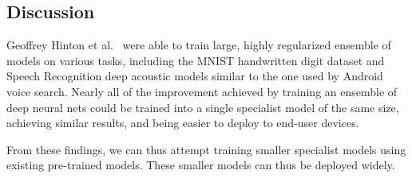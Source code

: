 \subsection{Discussion}

Geoffrey Hinton et al.~\cite{hinton2015distilling} were able to train large, highly regularized
ensemble of models on various tasks, including the MNIST handwritten digit dataset and Speech 
Recognition deep acoustic models similar to the one used by Android voice search. Nearly all of the 
improvement achieved by training an ensemble of deep neural nets could be trained into a single specialist
model of the same size, achieving similar results, and being easier to deploy to end-user devices.

From these findings, we can thus attempt training smaller specialist models using existing pre-trained models.
These smaller models can thus be deployed widely.